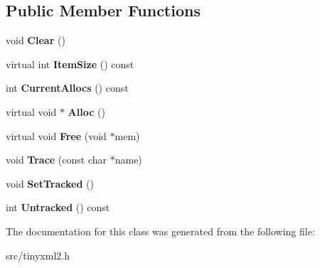 \subsection*{Public Member Functions}
\begin{DoxyCompactItemize}
\item 
void {\bfseries Clear} ()\hypertarget{classtinyxml2_1_1_mem_pool_t_a469d55e82be97d5ffeff82dd001a7029}{}\label{classtinyxml2_1_1_mem_pool_t_a469d55e82be97d5ffeff82dd001a7029}

\item 
virtual int {\bfseries Item\+Size} () const \hypertarget{classtinyxml2_1_1_mem_pool_t_a7ec8778fe99f6e332615a703be0b48bc}{}\label{classtinyxml2_1_1_mem_pool_t_a7ec8778fe99f6e332615a703be0b48bc}

\item 
int {\bfseries Current\+Allocs} () const \hypertarget{classtinyxml2_1_1_mem_pool_t_a56be11b7db6a7ef00db17088a7769aab}{}\label{classtinyxml2_1_1_mem_pool_t_a56be11b7db6a7ef00db17088a7769aab}

\item 
virtual void $\ast$ {\bfseries Alloc} ()\hypertarget{classtinyxml2_1_1_mem_pool_t_aa9d785a48ffe6ea1be679bab13464486}{}\label{classtinyxml2_1_1_mem_pool_t_aa9d785a48ffe6ea1be679bab13464486}

\item 
virtual void {\bfseries Free} (void $\ast$mem)\hypertarget{classtinyxml2_1_1_mem_pool_t_a4f1a0c434e9e3d7391e5c16ed4ee8c70}{}\label{classtinyxml2_1_1_mem_pool_t_a4f1a0c434e9e3d7391e5c16ed4ee8c70}

\item 
void {\bfseries Trace} (const char $\ast$name)\hypertarget{classtinyxml2_1_1_mem_pool_t_a0bc596f271e0f139822c534238b3f244}{}\label{classtinyxml2_1_1_mem_pool_t_a0bc596f271e0f139822c534238b3f244}

\item 
void {\bfseries Set\+Tracked} ()\hypertarget{classtinyxml2_1_1_mem_pool_t_a7798932414916199a1bc0f9c3f368521}{}\label{classtinyxml2_1_1_mem_pool_t_a7798932414916199a1bc0f9c3f368521}

\item 
int {\bfseries Untracked} () const \hypertarget{classtinyxml2_1_1_mem_pool_t_a524b90d0edeac41964c06510757dce0f}{}\label{classtinyxml2_1_1_mem_pool_t_a524b90d0edeac41964c06510757dce0f}

\end{DoxyCompactItemize}


The documentation for this class was generated from the following file\+:\begin{DoxyCompactItemize}
\item 
src/tinyxml2.\+h\end{DoxyCompactItemize}
